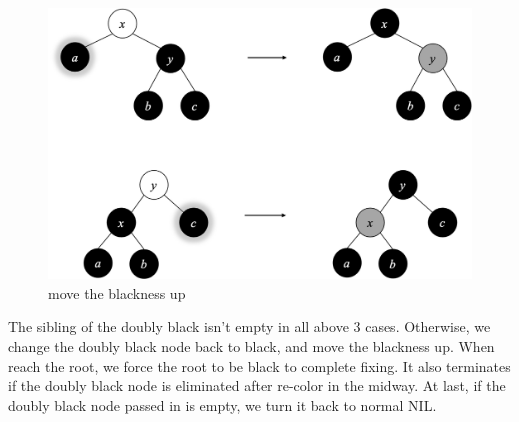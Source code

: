 \documentclass[b5paper]{article}
\begin{document}
\begin{figure}[htbp]
  \centering
  \includegraphics[scale=0.4]{../../../datastruct/tree/red-black-tree/img/del-case3}
  \caption{move the blackness up}
  \label{fig:del-case3}
\end{figure}

The sibling of the doubly black isn't empty in all above 3 cases. Otherwise, we change the doubly black node back to black, and move the blackness up. When reach the root, we force the root to be black to complete fixing. It also terminates if the doubly black node is eliminated after re-color in the midway. At last, if the doubly black node passed in is empty, we turn it back to normal NIL.
\end{document}
